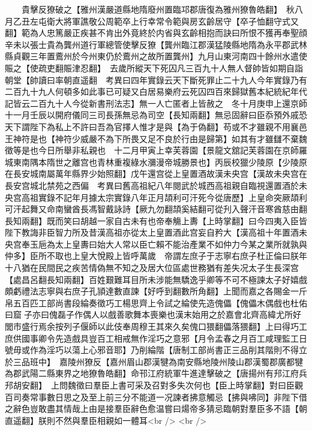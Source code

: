 　　貴擊反獠破之【雅州漢嚴道縣地隋廢州置臨邛郡唐復為雅州獠魯皓翻】　秋八月乙丑左屯衛大將軍譙敬公周範卒上行幸常令範與房玄齡居守【卒子恤翻守式又翻】範為人忠篤嚴正疾甚不肯出外竟終於内省與玄齡相抱而訣曰所恨不獲再奉聖顔　辛未以張士貴為龔州道行軍總管使擊反獠【龔州臨江郡漢猛陵縣地隋為永平郡武林縣貞觀三年置鷰州於今州東仍於鷰州之故所置龔州】九月山東河南四十餘州水遣使賑之【使疏吏翻賑津忍翻】　去歲所縱天下死囚凡三百九十人無人督帥皆如期自詣朝堂【帥讀曰率朝直遥翻　考異曰四年實錄云天下斷死罪止二十九人今年實錄乃有二百九十九人何頓多如此事已可疑又白居易樂府云死囚四百來歸獄舊本紀統紀年代記皆云二百九十人今從新書刑法志】無一人亡匿者上皆赦之　冬十月庚申上還京師　十一月壬辰以開府儀同三司長孫無忌為司空【長知兩翻】無忌固辭曰臣忝預外戚恐天下謂陛下為私上不許曰吾為官擇人惟才是與【為于偽翻】苟或不才雖親不用襄邑王神符是也【神符少威嚴不為下所畏又足不良於行由是歸第】如其有才雖讎不棄魏徵等是也今日所舉非私親也　十二月甲寅上幸芙蓉園【景龍文舘記芙蓉園在京師羅城東南隅本隋世之離宫也青林重複綠水瀰漫帝城勝景也】丙辰校獵少陵原【少陵原在長安城南屬萬年縣界少始照翻】戊午還宫從上皇置酒故漢未央宫【漢故未央宫在長安宫城北禁苑之西偏　考異曰舊高祖紀八年閱武於城西高祖親自臨視還置酒於未央宫高祖實錄不記年月據太宗實錄八年正月頡利可汗死今從唐歷】上皇命突厥頡利可汗起舞又命南蠻酋長馮智戴詠詩【厥九勿翻頡奚結翻可從刋入聲汗音寒酋慈由翻長知兩翻】既而笑曰胡越一家自古未有也帝奉觴上夀【上時掌翻】曰今四夷入臣皆陛下教誨非臣智力所及昔漢高祖亦從太上皇置酒此宫妄自矜大【漢高祖十年置酒未央宫奉玉巵為太上皇夀曰始大人常以臣亡賴不能治產業不如仲力今某之業所就孰與仲多】臣所不取也上皇大悅殿上皆呼萬歲　帝謂左庶子于志寧右庶子杜正倫曰朕年十八猶在民間民之疾苦情偽無不知之及居大位區處世務猶有差失况太子生長深宫【處昌呂翻長知兩翻】百姓艱難耳目所未涉能無驕逸乎卿等不可不極諫太子好嬉戲頗虧禮法志寧與右庶子孔頴達數直諫【好呼到翻數所角翻】上聞而嘉之各賜金一斤帛五百匹工部尚書段綸奏徵巧工楊思齊上令試之綸使先造傀儡【傀儡木偶戲也杜佑曰窟子亦曰傀磊子作偶人以戲善歌舞本喪樂也漢末始用之於嘉會北齊高緯尤所好閭市盛行焉余按列子偃師以此伎奉周穆王其來久矣傀口猥翻儡落猥翻】上曰得巧工庶供國事卿令先造戲具豈百工相戒無作淫巧之意邪【月令孟春之月百工咸理監工日號毋或作為淫巧以蕩上心邪音耶】乃削綸階【唐制工部尚書正三品削其階則不得立於三品班中】　嘉陵州獠反【嘉州眉山郡漢犍為南安縣地陵州陵山郡漢蜀郡廣都犍為郡武陽二縣東界之地獠魯皓翻】命邗江府統軍牛進達擊破之【唐揚州有䢴江府兵䢴胡安翻】　上問魏徵曰羣臣上書可采及召對多失次何也【臣上時掌翻】對曰臣觀百司奏常事數日思之及至上前三分不能道一况諫者拂意觸忌【拂與咈同】非陛下借之辭色豈敢盡其情哉上由是接羣臣辭色愈温嘗曰煬帝多猜忌臨朝對羣臣多不語【朝直遥翻】朕則不然與羣臣相親如一體耳<br />
<br />
